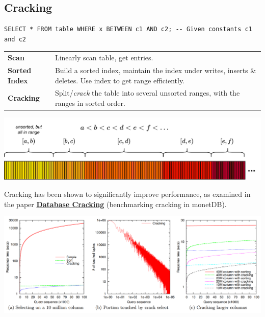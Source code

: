 \subsection{Cracking}
\begin{verbatim}
SELECT * FROM table WHERE x BETWEEN c1 AND c2; -- Given constants c1 and c2
\end{verbatim}
\begin{center}
    \begin{tabular}{l p{}}
        \textbf{Scan}         & Linearly scan table, get entries.                                                                              \\
        \textbf{Sorted Index} & Build a sorted index, maintain the index under writes, inserts \& deletes. Use index to get range efficiently. \\
        \textbf{Cracking}     & Split/\textit{crack} the table into several unsorted ranges, with the ranges in sorted order.                  \\
    \end{tabular}
\end{center}
\begin{center}
    \includegraphics[width=\textwidth]{advanced_topics/images/cracked_table.drawio.png}
\end{center}
Cracking has been shown to significantly improve performance, as examined in the paper \href{https://stratos.seas.harvard.edu/files/IKM_CIDR07.pdf}{\textbf{Database Cracking}} (benchmarking cracking in monetDB).
\begin{center}
    \includegraphics[width=.9\textwidth]{advanced_topics/images/cracking_perf.png}
\end{center}


